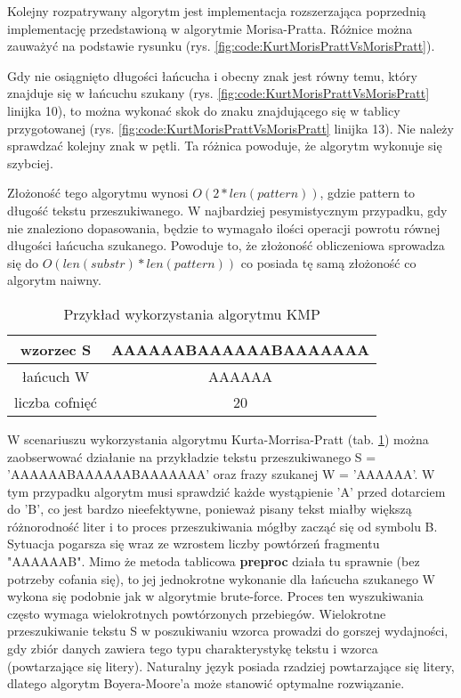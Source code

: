 Kolejny rozpatrywany algorytm jest implementacja rozszerzająca poprzednią 
implementację przedstawioną w algorytmie Morisa-Pratta. Różnice można zauważyć na podstawie rysunku
(rys. \ref{fig:code:KurtMorisPrattVsMorisPratt}).

Gdy nie osiągnięto długości łańcucha i obecny znak jest równy temu, który 
znajduje się w łańcuchu szukany (rys. \ref{fig:code:KurtMorisPrattVsMorisPratt}
linijka 10), to można wykonać skok do znaku znajdującego się w tablicy
przygotowanej (rys. \ref{fig:code:KurtMorisPrattVsMorisPratt} linijka 13).
Nie należy sprawdzać kolejny znak w pętli. Ta różnica powoduje, że algorytm 
wykonuje się szybciej.

Złożoność tego algorytmu wynosi $O(2*{len(pattern)})$, gdzie pattern to długość
tekstu przeszukiwanego. W najbardziej pesymistycznym przypadku, gdy nie 
znaleziono dopasowania, będzie to wymagało ilości operacji powrotu równej długości 
łańcucha szukanego. Powoduje to, że złożoność obliczeniowa sprowadza się do
$O({len(substr)}*{len(pattern)})$ co posiada tę samą złożoność co algorytm naiwny. 

\begin{table}[hbtp]
  \centering
  \begin{tabular}{ |c|c|  } 
    \hline
    wzorzec S & AAAAAABAAAAAABAAAAAAA \\
    \hline
    łańcuch W & AAAAAA \\
    \hline
    liczba cofnięć & 20 \\
    \hline
  \end{tabular}
  \caption{Przykład wykorzystania algorytmu KMP}
  \label{tabela:KMPExampleSlow}
\end{table}

W scenariuszu wykorzystania algorytmu Kurta-Morrisa-Pratt (tab. \ref{tabela:KMPExampleSlow})
można zaobserwować działanie na przykładzie tekstu przeszukiwanego S = 
'AAAAAABAAAAAABAAAAAAA' oraz frazy szukanej W = 'AAAAAA'. W tym przypadku algorytm musi sprawdzić każde
wystąpienie 'A' przed dotarciem do 'B', co jest bardzo nieefektywne, ponieważ
pisany tekst miałby większą różnorodność liter i to proces przeszukiwania mógłby 
zacząć się od symbolu B. Sytuacja 
pogarsza się wraz ze wzrostem liczby powtórzeń fragmentu "AAAAAAB". Mimo że 
metoda tablicowa \textbf{preproc} działa tu sprawnie (bez potrzeby cofania się), to jej 
jednokrotne wykonanie dla łańcucha szukanego W wykona się podobnie jak w algorytmie
brute-force. Proces ten wyszukiwania często wymaga wielokrotnych powtórzonych przebiegów. 
Wielokrotne przeszukiwanie tekstu S w poszukiwaniu wzorca prowadzi do gorszej
wydajności, gdy zbiór danych zawiera tego typu 
charakterystykę tekstu i wzorca (powtarzające się litery). Naturalny język posiada
rzadziej powtarzające się litery, dlatego algorytm Boyera-Moore'a może stanowić 
optymalne rozwiązanie.

